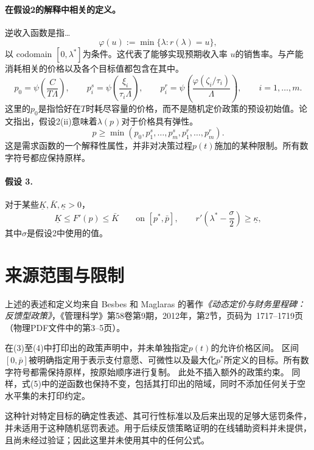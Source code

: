 \documentclass{article}
\begin{document}
\paragraph{在假设2的解释中相关的定义。}
逆收入函数是指…
\begin{equation}
\varphi(u):=\min\{\lambda:r(\lambda)=u\},
\tag{5}
\end{equation}
以 codomain $[0,\lambda^*]$为条件。这代表了能够实现预期收入率 $u$的销售率。与产能消耗相关的价格以及各个目标值都包含在其中。
\[
p_0=\psi\!\left(\frac{C}{T\Lambda}\right),
\qquad
p_i^s=\psi\!\left(\frac{\xi_i}{\tau_i\Lambda}\right),
\qquad
p_i^r=\psi\!\left(\frac{\varphi(\zeta_i/\tau_i)}{\Lambda}\right),
\qquad i=1,\ldots,m.
\]
这里的$p_0$是指恰好在$T$时耗尽容量的价格，而不是随机定价政策的预设初始值。论文指出，假设2(ii)意味着$\lambda(p)$对于价格具有弹性。
\[
p\ge\min(p_0,p_1^s,\ldots,p_m^s,p_1^r,\ldots,p_m^r).
\]
这是需求函数的一个解释性属性，并非对决策过程$p(t)$施加的某种限制。所有数字符号都应保持原样。

\paragraph{假设 3.}
对于某些$\underline K,\bar K,\underline\kappa>0$，
\[
\underline K\le F'(p)\le\bar K
\qquad\text{on }[p^*,\bar p],
\qquad
r'\!\left(\lambda^*-\frac{\sigma}{2}\right)
\ge\underline\kappa,
\]
其中$\sigma$是假设2中使用的值。

\section*{来源范围与限制}

上述的表述和定义均来自 Besbes 和 Maglaras 的著作\emph{《动态定价与财务里程碑：反馈型政策》}，《管理科学》第58卷第9期，2012年，第2节，页码为~1717–1719页（物理PDF文件中的第3–5页）。

在(3)至(4)中打印出的政策声明中，并未单独指定$p(t)$的允许价格区间。 区间$[0,\bar p]$被明确指定用于表示支付意愿、可微性以及最大化$p^*$所定义的目标。所有数字符号都需保持原样，按原始顺序进行复制。 此处不插入额外的政策约束。 同样，式(5)中的逆函数也保持不变，包括其打印出的陪域，同时不添加任何关于空水平集的未打印约定。

这种针对特定目标的确定性表述、其可行性标准以及后来出现的足够大惩罚条件，并未适用于这种随机惩罚表述。用于后续反馈策略证明的在线辅助资料并未提供，且尚未经过验证；因此这里并未使用其中的任何公式。
\end{document}
